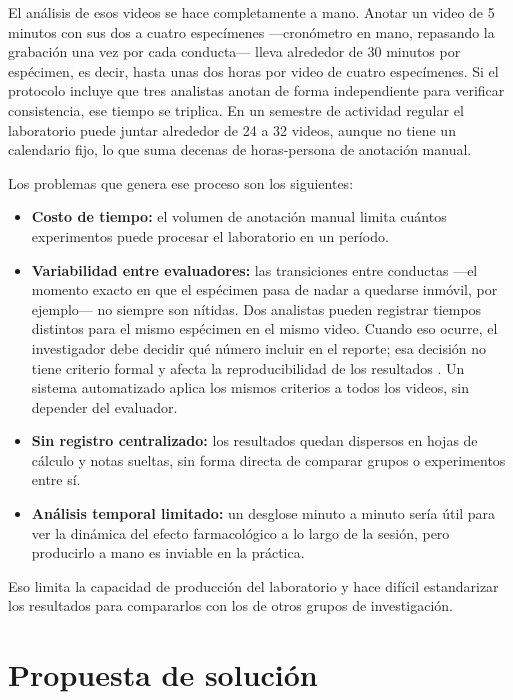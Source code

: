 El análisis de esos videos se hace completamente a mano. Anotar un video de 5 minutos
con sus dos a cuatro especímenes ---cronómetro en mano, repasando la grabación una vez por
cada conducta--- lleva alrededor de 30 minutos por espécimen, es decir, hasta unas dos
horas por video de cuatro especímenes. Si el protocolo incluye que tres
analistas anotan de forma independiente para verificar consistencia, ese tiempo se
triplica. En un semestre de actividad regular el laboratorio puede juntar alrededor de
24 a 32 videos, aunque no tiene un calendario fijo, lo que suma decenas de horas-persona
de anotación manual.

Los problemas que genera ese proceso son los siguientes:

\begin{itemize}
  \item \textbf{Costo de tiempo:} el volumen de anotación manual limita cuántos
        experimentos puede procesar el laboratorio en un período.
  \item \textbf{Variabilidad entre evaluadores:} las transiciones entre conductas
        ---el momento exacto en que el espécimen pasa de nadar a quedarse inmóvil, por
        ejemplo--- no siempre son nítidas. Dos analistas pueden registrar tiempos
        distintos para el mismo espécimen en el mismo video. Cuando eso ocurre, el
        investigador debe decidir qué número incluir en el reporte; esa decisión no
        tiene criterio formal y afecta la reproducibilidad de los resultados
        \cite{armario2021}. Un sistema automatizado aplica los mismos criterios a todos los
        videos, sin depender del evaluador.
  \item \textbf{Sin registro centralizado:} los resultados quedan dispersos en hojas
        de cálculo y notas sueltas, sin forma directa de comparar grupos o
        experimentos entre sí.
  \item \textbf{Análisis temporal limitado:} un desglose minuto a minuto sería útil
        para ver la dinámica del efecto farmacológico a lo largo de la sesión, pero
        producirlo a mano es inviable en la práctica.
\end{itemize}

Eso limita la capacidad de producción del laboratorio y hace difícil estandarizar los
resultados para compararlos con los de otros grupos de investigación.

\section{Propuesta de solución}

